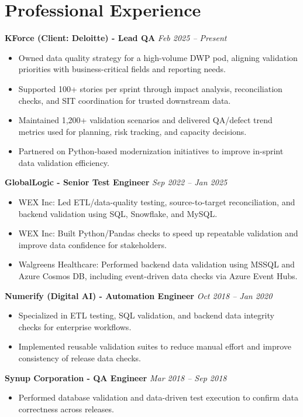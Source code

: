 \documentclass[10pt,letterpaper]{article}
\newcommand{\roleline}[2]{
  \textbf{#1} \hfill \textit{#2} \\[-4pt]
}
\begin{document}
\section*{Professional Experience}
\roleline{KForce (Client: Deloitte) - Lead QA}{Feb 2025 -- Present}
\begin{itemize}
  \item Owned data quality strategy for a high-volume DWP pod, aligning validation priorities with business-critical fields and reporting needs.
  \item Supported 100+ stories per sprint through impact analysis, reconciliation checks, and SIT coordination for trusted downstream data.
  \item Maintained 1,200+ validation scenarios and delivered QA/defect trend metrics used for planning, risk tracking, and capacity decisions.
  \item Partnered on Python-based modernization initiatives to improve in-sprint data validation efficiency.
\end{itemize}

\roleline{GlobalLogic - Senior Test Engineer}{Sep 2022 -- Jan 2025}
\begin{itemize}
  \item WEX Inc: Led ETL/data-quality testing, source-to-target reconciliation, and backend validation using SQL, Snowflake, and MySQL.
  \item WEX Inc: Built Python/Pandas checks to speed up repeatable validation and improve data confidence for stakeholders.
  \item Walgreens Healthcare: Performed backend data validation using MSSQL and Azure Cosmos DB, including event-driven data checks via Azure Event Hubs.
\end{itemize}

\roleline{Numerify (Digital AI) - Automation Engineer}{Oct 2018 -- Jan 2020}
\begin{itemize}
  \item Specialized in ETL testing, SQL validation, and backend data integrity checks for enterprise workflows.
  \item Implemented reusable validation suites to reduce manual effort and improve consistency of release data checks.
\end{itemize}

\roleline{Synup Corporation - QA Engineer}{Mar 2018 -- Sep 2018}
\begin{itemize}
  \item Performed database validation and data-driven test execution to confirm data correctness across releases.
\end{itemize}
\end{document}
